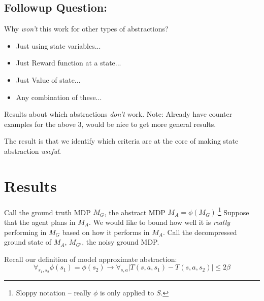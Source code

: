 \documentclass[11pt]{amsart}
\begin{document}
\subsection{Followup Question:} Why {\it won't} this work for other types of abstractions?
\begin{itemize}
\item Just using state variables...
\item Just Reward function at a state...
\item Just Value of state...
\item Any combination of these...
\end{itemize}

Results about which abstractions {\it don't} work. Note: Already have counter examples for the above 3, would be nice to get more general results.

The result is that we identify which criteria are at the core of making state abstraction {\it useful}.



\newpage
\section{Results}


Call the ground truth MDP $M_G$, the abstract MDP $M_A=\phi(M_G)$.\footnote{Sloppy notation -- really $\phi$ is only applied to $S$.} Suppose that the agent plans in $M_A$. We would like to bound how well it is \textit{really} performing in $M_G$ based on how it performs in $M_A$. Call the decompressed ground state of $M_A$, $M_{G'}$, the noisy ground MDP.


 Recall our definition of model approximate abstraction:
\begin{equation}
\forall_{s_1,s_2} \phi(s_1) = \phi(s_2) \rightarrow \forall_{s,a} | T(s,a,s_1) - T(s,a,s_2) | \leq 2\beta
\label{eq:approx_model_abs}
\end{equation}
\end{document}
